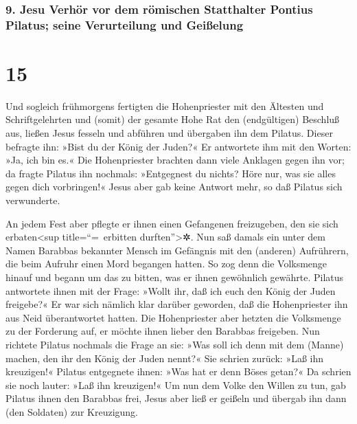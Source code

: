 \hypertarget{jesu-verhuxf6r-vor-dem-ruxf6mischen-statthalter-pontius-pilatus-seine-verurteilung-und-geiuxdfelung}{%
\subsubsection{9. Jesu Verhör vor dem römischen Statthalter Pontius
Pilatus; seine Verurteilung und
Geißelung}\label{jesu-verhuxf6r-vor-dem-ruxf6mischen-statthalter-pontius-pilatus-seine-verurteilung-und-geiuxdfelung}}

\hypertarget{section-14}{%
\section{15}\label{section-14}}

 Und sogleich frühmorgens fertigten die Hohenpriester mit
den Ältesten und Schriftgelehrten und (somit) der gesamte Hohe Rat den
(endgültigen) Beschluß aus, ließen Jesus fesseln und abführen und
übergaben ihn dem Pilatus.  Dieser befragte ihn: »Bist du
der König der Juden?« Er antwortete ihm mit den Worten: »Ja, ich bin
es.«  Die Hohenpriester brachten dann viele Anklagen gegen
ihn vor;  da fragte Pilatus ihn nochmals: »Entgegnest du
nichts? Höre nur, was sie alles gegen dich vorbringen!« 
Jesus aber gab keine Antwort mehr, so daß Pilatus sich verwunderte.

 An jedem Fest aber pflegte er ihnen einen Gefangenen
freizugeben, den sie sich erbaten\textless sup title=``=~erbitten
durften''\textgreater✲.  Nun saß damals ein unter dem
Namen Barabbas bekannter Mensch im Gefängnis mit den (anderen)
Aufrührern, die beim Aufruhr einen Mord begangen hatten. 
So zog denn die Volksmenge hinauf und begann um das zu bitten, was er
ihnen gewöhnlich gewährte.  Pilatus antwortete ihnen mit
der Frage: »Wollt ihr, daß ich euch den König der Juden freigebe?«
 Er war sich nämlich klar darüber geworden, daß die
Hohenpriester ihn aus Neid überantwortet hatten.  Die
Hohenpriester aber hetzten die Volksmenge zu der Forderung auf, er
möchte ihnen lieber den Barabbas freigeben.  Nun richtete
Pilatus nochmals die Frage an sie: »Was soll ich denn mit dem (Manne)
machen, den ihr den König der Juden nennt?«  Sie schrien
zurück: »Laß ihn kreuzigen!«  Pilatus entgegnete ihnen:
»Was hat er denn Böses getan?« Da schrien sie noch lauter: »Laß ihn
kreuzigen!«  Um nun dem Volke den Willen zu tun, gab
Pilatus ihnen den Barabbas frei, Jesus aber ließ er geißeln und übergab
ihn dann (den Soldaten) zur Kreuzigung.

